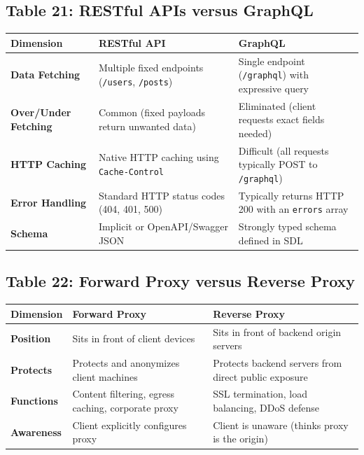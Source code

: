\subsection*{Table 21: RESTful APIs versus GraphQL}
\begin{center}
\small
\begin{tabularx}{\textwidth}{lXX}
\toprule
\textbf{Dimension} & \textbf{RESTful API} & \textbf{GraphQL} \\
\midrule
\textbf{Data Fetching} & Multiple fixed endpoints (\lstinline|/users|, \lstinline|/posts|) & Single endpoint (\lstinline|/graphql|) with expressive query \\
\textbf{Over/Under Fetching} & Common (fixed payloads return unwanted data) & Eliminated (client requests exact fields needed) \\
\textbf{HTTP Caching} & Native HTTP caching using \lstinline|Cache-Control| & Difficult (all requests typically POST to \lstinline|/graphql|) \\
\textbf{Error Handling} & Standard HTTP status codes (404, 401, 500) & Typically returns HTTP 200 with an \lstinline|errors| array \\
\textbf{Schema} & Implicit or OpenAPI/Swagger JSON & Strongly typed schema defined in SDL \\
\bottomrule
\end{tabularx}
\end{center}

\subsection*{Table 22: Forward Proxy versus Reverse Proxy}
\begin{center}
\small
\begin{tabularx}{\textwidth}{lXX}
\toprule
\textbf{Dimension} & \textbf{Forward Proxy} & \textbf{Reverse Proxy} \\
\midrule
\textbf{Position} & Sits in front of client devices & Sits in front of backend origin servers \\
\textbf{Protects} & Protects and anonymizes client machines & Protects backend servers from direct public exposure \\
\textbf{Functions} & Content filtering, egress caching, corporate proxy & SSL termination, load balancing, DDoS defense \\
\textbf{Awareness} & Client explicitly configures proxy & Client is unaware (thinks proxy is the origin) \\
\bottomrule
\end{tabularx}
\end{center}

